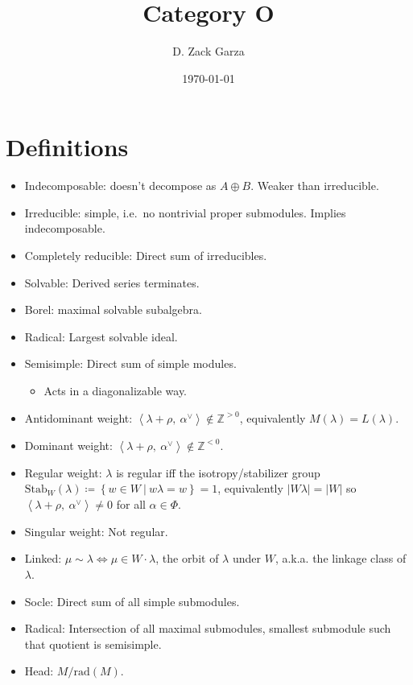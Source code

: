 \documentclass[11pt]{scrartcl}
\title{
\textbf{
    Category O
  }
  }
\author{D. Zack Garza}
\date{\today}
\theoremstyle{definition}
\theoremstyle{theorem}
\theoremstyle{proof}
\theoremstyle{definition}
\theoremstyle{break}
\theoremstyle{problem}
\providecommand{\tightlist}{%
  \setlength{\itemsep}{0pt}\setlength{\parskip}{0pt}}
\newcommand{\ZZ}[0]{{\mathbb{Z}}}
\newcommand{\abs}[1]{{\left\lvert {#1} \right\rvert}}
\newcommand{\definedas}[0]{\coloneqq}
\newcommand{\dual}[0]{^\vee}
\newcommand{\inner}[2]{{\left\langle {#1},~{#2} \right\rangle}}
\newcommand{\stab}[0]{{\mathrm{Stab}}}
\newcommand{\suchthat}[0]{{~\mathrel{\Big|}~}}
\newcommand{\theset}[1]{\left\{{#1}\right\}}
\begin{document}
\maketitle
\tableofcontents

\renewcommand{\listtheoremname}{List of Definitions}
\listoftheorems[ignoreall,show={definition}, numwidth=3.5em]

\renewcommand{\listtheoremname}{List of Theorems}
\listoftheorems[ignoreall,show={theorem,proposition}]

\hypertarget{definitions}{%
\section{Definitions}\label{definitions}}

\begin{itemize}
\tightlist
\item
  Indecomposable: doesn't decompose as \(A \oplus B\). Weaker than
  irreducible.
\item
  Irreducible: simple, i.e.~no nontrivial proper submodules. Implies
  indecomposable.
\item
  Completely reducible: Direct sum of irreducibles.
\item
  Solvable: Derived series terminates.
\item
  Borel: maximal solvable subalgebra.
\item
  Radical: Largest solvable ideal.
\item
  Semisimple: Direct sum of simple modules.

  \begin{itemize}
  \tightlist
  \item
    Acts in a diagonalizable way.
  \end{itemize}
\item
  Antidominant weight:
  \(\inner{\lambda + \rho}{\alpha\dual} \not\in\ZZ^{>0}\), equivalently
  \(M(\lambda) = L(\lambda)\).
\item
  Dominant weight:
  \(\inner{\lambda + \rho}{\alpha\dual} \not\in \ZZ^{< 0}\).
\item
  Regular weight: \(\lambda\) is regular iff the isotropy/stabilizer
  group
  \(\stab_W(\lambda) \definedas \theset{w\in W\suchthat w\lambda = w}= 1\),
  equivalently \(\abs{W\lambda} = \abs{W}\) so
  \(\inner{\lambda + \rho}{\alpha\dual} \neq 0\) for all
  \(\alpha\in \Phi\).
\item
  Singular weight: Not regular.
\item
  Linked: \(\mu \sim \lambda \iff \mu \in W\cdot \lambda\), the orbit of
  \(\lambda\) under \(W\), a.k.a. the linkage class of \(\lambda\).
\item
  Socle: Direct sum of all simple submodules.
\item
  Radical: Intersection of all maximal submodules, smallest submodule
  such that quotient is semisimple.
\item
  Head: \(M / \mathrm{rad}(M)\).
\end{itemize}
\end{document}
